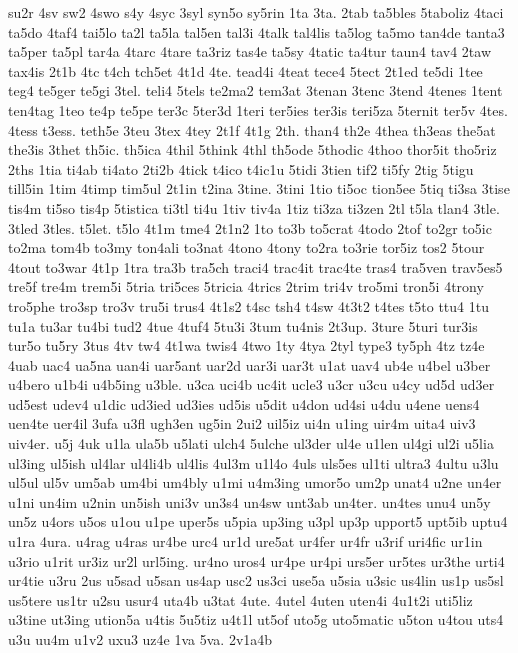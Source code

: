 {su2r
4sv
sw2
4swo
s4y
4syc
3syl
syn5o
sy5rin
1ta
3ta.
2tab
ta5bles
5taboliz
4taci
ta5do
4taf4
tai5lo
ta2l
ta5la
tal5en
tal3i
4talk
tal4lis
ta5log
ta5mo
tan4de
tanta3
ta5per
ta5pl
tar4a
4tarc
4tare
ta3riz
tas4e
ta5sy
4tatic
ta4tur
taun4
tav4
2taw
tax4is
2t1b
4tc
t4ch
tch5et
4t1d
4te.
tead4i
4teat
tece4
5tect
2t1ed
te5di
1tee
teg4
te5ger
te5gi
3tel.
teli4
5tels
te2ma2
tem3at
3tenan
3tenc
3tend
4tenes
1tent
ten4tag
1teo
te4p
te5pe
ter3c
5ter3d
1teri
ter5ies
ter3is
teri5za
5ternit
ter5v
4tes.
4tess
t3ess.
teth5e
3teu
3tex
4tey
2t1f
4t1g
2th.
than4
th2e
4thea
th3eas
the5at
the3is
3thet
th5ic.
th5ica
4thil
5think
4thl
th5ode
5thodic
4thoo
thor5it
tho5riz
2ths
1tia
ti4ab
ti4ato
2ti2b
4tick
t4ico
t4ic1u
5tidi
3tien
tif2
ti5fy
2tig
5tigu
till5in
1tim
4timp
tim5ul
2t1in
t2ina
3tine.
3tini
1tio
ti5oc
tion5ee
5tiq
ti3sa
3tise
tis4m
ti5so
tis4p
5tistica
ti3tl
ti4u
1tiv
tiv4a
1tiz
ti3za
ti3zen
2tl
t5la
tlan4
3tle.
3tled
3tles.
t5let.
t5lo
4t1m
tme4
2t1n2
1to
to3b
to5crat
4todo
2tof
to2gr
to5ic
to2ma
tom4b
to3my
ton4ali
to3nat
4tono
4tony
to2ra
to3rie
tor5iz
tos2
5tour
4tout
to3war
4t1p
1tra
tra3b
tra5ch
traci4
trac4it
trac4te
tras4
tra5ven
trav5es5
tre5f
tre4m
trem5i
5tria
tri5ces
5tricia
4trics
2trim
tri4v
tro5mi
tron5i
4trony
tro5phe
tro3sp
tro3v
tru5i
trus4
4t1s2
t4sc
tsh4
t4sw
4t3t2
t4tes
t5to
ttu4
1tu
tu1a
tu3ar
tu4bi
tud2
4tue
4tuf4
5tu3i
3tum
tu4nis
2t3up.
3ture
5turi
tur3is
tur5o
tu5ry
3tus
4tv
tw4
4t1wa
twis4
4two
1ty
4tya
2tyl
type3
ty5ph
4tz
tz4e
4uab
uac4
ua5na
uan4i
uar5ant
uar2d
uar3i
uar3t
u1at
uav4
ub4e
u4bel
u3ber
u4bero
u1b4i
u4b5ing
u3ble.
u3ca
uci4b
uc4it
ucle3
u3cr
u3cu
u4cy
ud5d
ud3er
ud5est
udev4
u1dic
ud3ied
ud3ies
ud5is
u5dit
u4don
ud4si
u4du
u4ene
uens4
uen4te
uer4il
3ufa
u3fl
ugh3en
ug5in
2ui2
uil5iz
ui4n
u1ing
uir4m
uita4
uiv3
uiv4er.
u5j
4uk
u1la
ula5b
u5lati
ulch4
5ulche
ul3der
ul4e
u1len
ul4gi
ul2i
u5lia
ul3ing
ul5ish
ul4lar
ul4li4b
ul4lis
4ul3m
u1l4o
4uls
uls5es
ul1ti
ultra3
4ultu
u3lu
ul5ul
ul5v
um5ab
um4bi
um4bly
u1mi
u4m3ing
umor5o
um2p
unat4
u2ne
un4er
u1ni
un4im
u2nin
un5ish
uni3v
un3s4
un4sw
unt3ab
un4ter.
un4tes
unu4
un5y
un5z
u4ors
u5os
u1ou
u1pe
uper5s
u5pia
up3ing
u3pl
up3p
upport5
upt5ib
uptu4
u1ra
4ura.
u4rag
u4ras
ur4be
urc4
ur1d
ure5at
ur4fer
ur4fr
u3rif
uri4fic
ur1in
u3rio
u1rit
ur3iz
ur2l
url5ing.
ur4no
uros4
ur4pe
ur4pi
urs5er
ur5tes
ur3the
urti4
ur4tie
u3ru
2us
u5sad
u5san
us4ap
usc2
us3ci
use5a
u5sia
u3sic
us4lin
us1p
us5sl
us5tere
us1tr
u2su
usur4
uta4b
u3tat
4ute.
4utel
4uten
uten4i
4u1t2i
uti5liz
u3tine
ut3ing
ution5a
u4tis
5u5tiz
u4t1l
ut5of
uto5g
uto5matic
u5ton
u4tou
uts4
u3u
uu4m
u1v2
uxu3
uz4e
1va
5va.
2v1a4b
}
